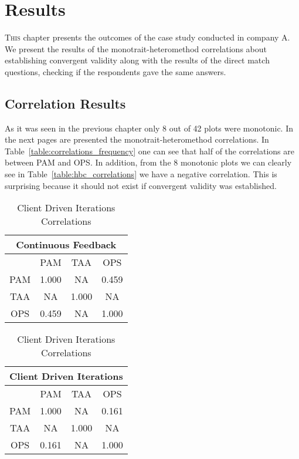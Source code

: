 \chapter{Results}
\label{ch:results}


\lettrine[lines=4, loversize=-0.1, lraise=0.1]{T}{his} chapter presents the outcomes of the case study conducted in company A. We present the results of the monotrait-heteromethod correlations about establishing convergent validity along with the results of the direct match questions, checking if the respondents gave the same answers.

\section{Correlation Results}
As it was seen in the previous chapter only 8 out of 42 plots were monotonic. In the next pages are presented the monotrait-heteromethod correlations. In Table~\ref{table:correlations_frequency} one can see that half of the correlations are between \ac{PAM} and \ac{OPS}. In addition, from the 8 monotonic plots we can clearly see in Table~\ref{table:hbc_correlations} we have a negative correlation. This is surprising because it should not exist if convergent validity was established.  %

\begin{table} [H]
 \RawFloats %
 \begin{minipage}{.45\textwidth}
  \caption{Continuous Feedback Correlations}
  \label{table:cf_correlations}
   \begin{tabular}{| c | c | c | c |} \hline
   \multicolumn{4}{|c|}{\textbf{Continuous Feedback}}  \\ \hline
   & \ac{PAM} & \ac{TAA} & \ac{OPS} \\ \hline
   \ac{PAM} & 1.000 & NA & 0.459 \\ \hline
   \ac{TAA} & NA & 1.000 & NA \\ \hline
   \ac{OPS} & 0.459 & NA & 1.000 \\ \hline
  \end{tabular}
 \end{minipage}%
%
 \begin{minipage}{.45\textwidth}
  \centering
  \caption{Client Driven Iterations Correlations}
  \label{table:cdi_correlations}
  \begin{tabular}{| c | c | c | c |} \hline
  \multicolumn{4}{|c|}{\textbf{Client Driven Iterations}}  \\ \hline
   & \ac{PAM} & \ac{TAA} & \ac{OPS} \\ \hline
  \ac{PAM} & 1.000 & NA & 0.161 \\ \hline
  \ac{TAA} & NA & 1.000 & NA \\ \hline
  \ac{OPS} & 0.161 & NA & 1.000 \\ \hline
 \end{tabular}
 \end{minipage}%
\end{table}


